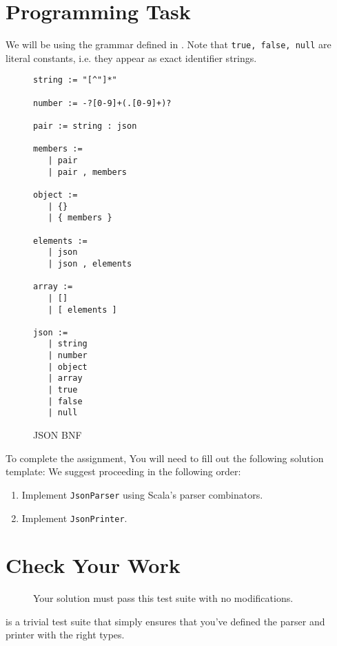 \section{Programming Task}
We will be using the grammar defined in . Note that
\texttt{true, false, null} are literal constants, i.e. they appear as exact
identifier strings.
\begin{figure}
\begin{verbatim}
string := "[^"]*"

number := -?[0-9]+(.[0-9]+)?

pair := string : json

members :=
   | pair
   | pair , members

object :=
   | {}
   | { members }

elements :=
   | json
   | json , elements

array :=
   | []
   | [ elements ]

json :=
   | string
   | number
   | object
   | array
   | true
   | false
   | null
\end{verbatim}
\caption{JSON BNF}\label{json-bnf}
\end{figure}
To complete the assignment, You will need to fill out the following solution
template:
We suggest proceeding in the following order:
\begin{enumerate}
    \item Implement \lstinline|JsonParser| using Scala's parser combinators.
    \item Implement \lstinline|JsonPrinter|.
\end{enumerate}

\section{Check Your Work}

\begin{figure}
\caption{Your solution must pass this test suite with no modifications.}
\label{parsing_tests}
\end{figure}

 is a trivial test suite that simply ensures that you've
defined the parser and printer with the right types.


